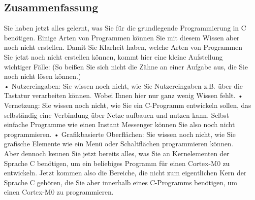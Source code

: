 \subsection{Zusammenfassung}

Sie haben jetzt alles gelernt, was Sie für die grundlegende Programmierung in C benötigen. Einige Arten von Programmen können Sie mit diesem Wissen aber noch nicht erstellen. Damit Sie Klarheit haben, welche Arten von Programmen Sie jetzt noch nicht erstellen können, kommt hier eine kleine Aufstellung wichtiger Fälle: (So beißen Sie sich nicht die Zähne an einer Aufgabe aus, die Sie noch nicht lösen können.)\\

•	Nutzereingaben: Sie wissen noch nicht, wie Sie Nutzereingaben z.B. über die Tastatur verarbeiten können. Wobei Ihnen hier nur ganz wenig Wissen fehlt.
•	Vernetzung: Sie wissen noch nicht, wie Sie ein C-Programm entwickeln sollen, das selbständig eine Verbindung über Netze aufbauen und nutzen kann. Selbst einfache Programme wie einen Instant Messenger können Sie also noch nicht programmieren.
•	Grafikbasierte Oberflächen: Sie wissen noch nicht, wie Sie grafische Elemente wie ein Menü oder Schaltflächen programmieren können.\\

Aber dennoch kennen Sie jetzt bereits alles, was Sie an Kernelementen der Sprache C benötigen, um ein beliebiges Programm für einen Cortex-M0 zu entwickeln. Jetzt kommen also die Bereiche, die nicht zum eigentlichen Kern der Sprache C gehören, die Sie aber innerhalb eines C-Programms benötigen, um einen Cortex-M0 zu programmieren.
